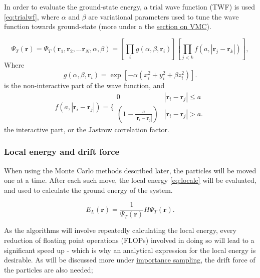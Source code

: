 \documentclass[%
oneside,                 %
final,                   %
10pt]{article}
\begin{document}
In order to evaluate the ground-state energy, a trial wave function (TWF) is used \eqref{eq:trialwf}, where $\alpha$ and $\beta$ are variational parameters used to tune the wave function towards ground-state (more under a the \hyperref[S:VMC]{section on VMC}).

\begin{equation}
 \Psi_T(\mathbf{r})=\Psi_T(\mathbf{r}_1, \mathbf{r}_2, \dots \mathbf{r}_N,\alpha,\beta)
 =\left[
    \prod_i g(\alpha,\beta,\mathbf{r}_i)
 \right]
 \left[
    \prod_{j<k}f(a,|\mathbf{r}_j-\mathbf{r}_k|)
 \right],
 \label{eq:trialwf}
\end{equation}
Where
\begin{equation}
    g(\alpha,\beta,\mathbf{r}_i)= \exp{[-\alpha(x_i^2+y_i^2+\beta z_i^2)]}.
 \end{equation}
is the non-interactive part of the wave function, and 
\begin{equation}
    f(a,|\mathbf{r}_i-\mathbf{r}_j|)=\Bigg\{
 \begin{array}{ll}
	 0 & {|\mathbf{r}_i-\mathbf{r}_j|} \leq {a}\\
	 (1-\frac{a}{|\mathbf{r}_i-\mathbf{r}_j|}) & {|\mathbf{r}_i-\mathbf{r}_j|} > {a}.
 \end{array}
 \end{equation}
the interactive part, or the Jastrow correlation factor.  



\subsubsection{Local energy and drift force}
When using the Monte Carlo methods described later, the particles will be moved one at a time. After each such move, the local energy \eqref{eq:locale} will be evaluated, and used to calculate the ground energy of the system. 
 
\begin{equation}
    E_L(\mathbf{r})=\frac{1}{\Psi_T(\mathbf{r})}H\Psi_T(\mathbf{r}).
    \label{eq:locale}
 \end{equation}
 
As the algorithms will involve repeatedly calculating the local energy, every reduction of floating point operations (FLOPs) involved in doing so will lead to a significant speed up - which is why an analytical expression for the local energy is desirable. As will be discussed more under \hyperref[importance_sampling]{importance sampling}, the drift force of the  particles are also needed;
\end{document}
